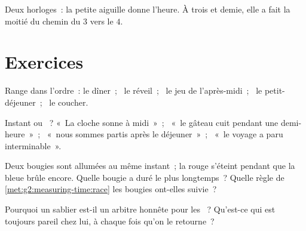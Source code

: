\begin{omfigure}

{\small Deux horloges~: la petite aiguille donne l'heure. À trois
 et demie, elle a fait la moitié du chemin du $3$ vers le $4$.}
\end{omfigure}

\section{Exercices}

\begin{exercise}[$\star$]\label{exo:g2:measuring-time:1}
Range dans l'ordre~: le dîner~; \ le réveil~; \ le jeu de
l'après-midi~; \ le petit-déjeuner~; \ le coucher.
\end{exercise}

\begin{exercise}[$\star$]\label{exo:g2:measuring-time:2}
Instant ou ~? «~La cloche sonne à midi~»~; \ «~le gâteau cuit
pendant une demi-heure~»~; \ «~nous sommes partis après le
déjeuner~»~; \ «~le voyage a paru interminable~».
\end{exercise}

\begin{exercise}[$\star$]\label{exo:g2:measuring-time:3}
Deux bougies sont allumées au même instant~; la rouge s'éteint
pendant que la bleue brûle encore. Quelle bougie a duré le plus
longtemps~? Quelle règle de \cref{met:g2:measuring-time:race} les
bougies ont-elles suivie~?
\end{exercise}

\begin{exercise}[$\star$]\label{exo:g2:measuring-time:4}
Pourquoi un sablier est-il un arbitre honnête pour les ~?
Qu'est-ce qui est toujours pareil chez lui, à chaque fois qu'on le
retourne~?
\end{exercise}

